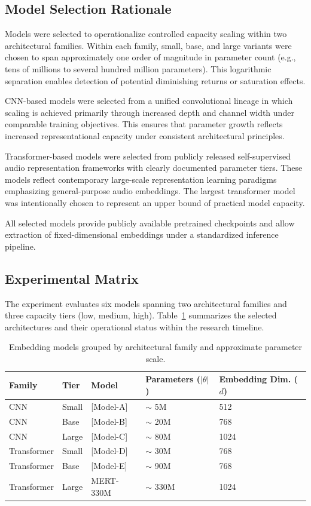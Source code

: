 \subsection{Model Selection Rationale}

Models were selected to operationalize controlled capacity scaling within two architectural families.
Within each family, small, base, and large variants were chosen to span approximately one order of magnitude in parameter count (e.g., tens of millions to several hundred million parameters).
This logarithmic separation enables detection of potential diminishing returns or saturation effects.

CNN-based models were selected from a unified convolutional lineage in which scaling is achieved primarily through increased depth and channel width under comparable training objectives.
This ensures that parameter growth reflects increased representational capacity under consistent architectural principles.

Transformer-based models were selected from publicly released self-supervised audio representation frameworks with clearly documented parameter tiers.
These models reflect contemporary large-scale representation learning paradigms emphasizing general-purpose audio embeddings.
The largest transformer model was intentionally chosen to represent an upper bound of practical model capacity.

All selected models provide publicly available pretrained checkpoints and allow extraction of fixed-dimensional embeddings under a standardized inference pipeline.



\subsection{Experimental Matrix}
The experiment evaluates six models spanning two architectural families and three capacity tiers (low, medium, high). 
Table~\ref{tab:model_matrix} summarizes the selected architectures and their operational status within the research timeline.

\begin{table}[h]
\centering
\begin{tabular}{|l|l|l|l|l|}
\hline
Family & Tier & Model & Parameters ($|\theta|$) & Embedding Dim. ($d$) \\ \hline
CNN & Small & [Model-A] & $\sim$ 5M & 512 \\ \hline
CNN & Base & [Model-B] & $\sim$ 20M & 768 \\ \hline
CNN & Large & [Model-C] & $\sim$ 80M & 1024 \\ \hline
Transformer & Small & [Model-D] & $\sim$ 30M & 768 \\ \hline
Transformer & Base & [Model-E] & $\sim$ 90M & 768 \\ \hline
Transformer & Large & MERT-330M & $\sim$ 330M & 1024 \\ \hline
\end{tabular}
\caption{Embedding models grouped by architectural family and approximate parameter scale.}
\label{tab:model_matrix}
\end{table}


